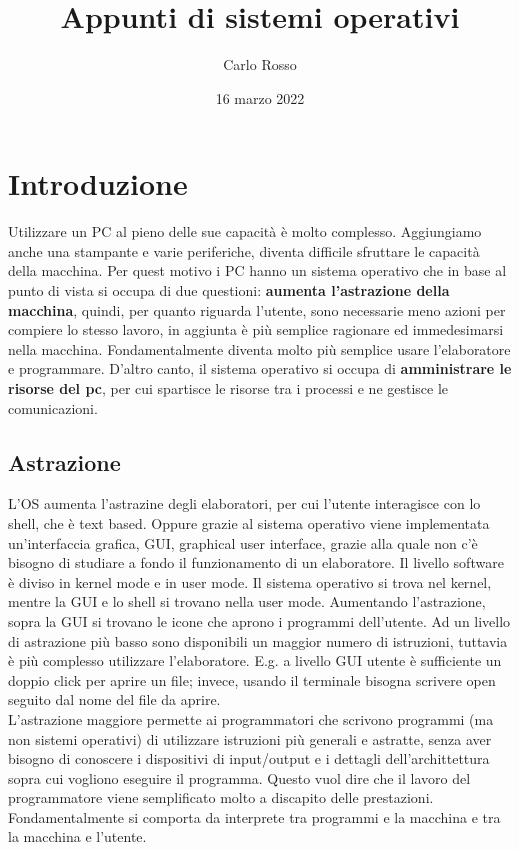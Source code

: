 \documentclass{article}
\title{Appunti di sistemi operativi}
\author{Carlo Rosso}
\date{16 marzo 2022}
\begin{document}
\begin{titlepage}
  \maketitle
  \thispagestyle{empty}
\end{titlepage}

\tableofcontents
\newpage

\section{Introduzione}
Utilizzare un PC al pieno delle sue capacità è molto complesso. Aggiungiamo anche una stampante e varie periferiche, diventa difficile sfruttare le capacità della macchina. Per quest motivo i PC hanno un sistema operativo che in base al punto di vista si occupa di due questioni: \textbf{aumenta l'astrazione della macchina}, quindi, per quanto riguarda l'utente, sono necessarie meno azioni per compiere lo stesso lavoro, in aggiunta è più semplice ragionare ed immedesimarsi nella macchina. Fondamentalmente diventa molto più semplice usare l'elaboratore e programmare. D'altro canto, il sistema operativo si occupa di \textbf{amministrare le risorse del pc}, per cui spartisce le risorse tra i processi e ne gestisce le comunicazioni.

\subsection{Astrazione}
L'OS aumenta l'astrazine degli elaboratori, per cui l'utente interagisce con lo shell, che è text based. Oppure grazie al sistema operativo viene implementata un'interfaccia grafica, GUI, graphical user interface, grazie alla quale non c'è bisogno di studiare a fondo il funzionamento di un elaboratore. Il livello software è diviso in kernel mode e in user mode. Il sistema operativo si trova nel kernel, mentre la GUI e lo shell si trovano nella user mode. Aumentando l'astrazione, sopra la GUI si trovano le icone che aprono i programmi dell'utente. Ad un livello di astrazione più basso sono disponibili un maggior numero di istruzioni, tuttavia è più complesso utilizzare l'elaboratore. E.g. a livello GUI utente è sufficiente un doppio click per aprire un file; invece, usando il terminale bisogna scrivere open seguito dal nome del file da aprire. \\
L'astrazione maggiore permette ai programmatori che scrivono programmi (ma non sistemi operativi) di utilizzare istruzioni più generali e astratte, senza aver bisogno di conoscere i dispositivi di input/output e i dettagli dell'archittettura sopra cui vogliono eseguire il programma. Questo vuol dire che il lavoro del programmatore viene semplificato molto a discapito delle prestazioni.\\
Fondamentalmente si comporta da interprete tra programmi e la macchina e tra la macchina e l'utente.
\end{document}
